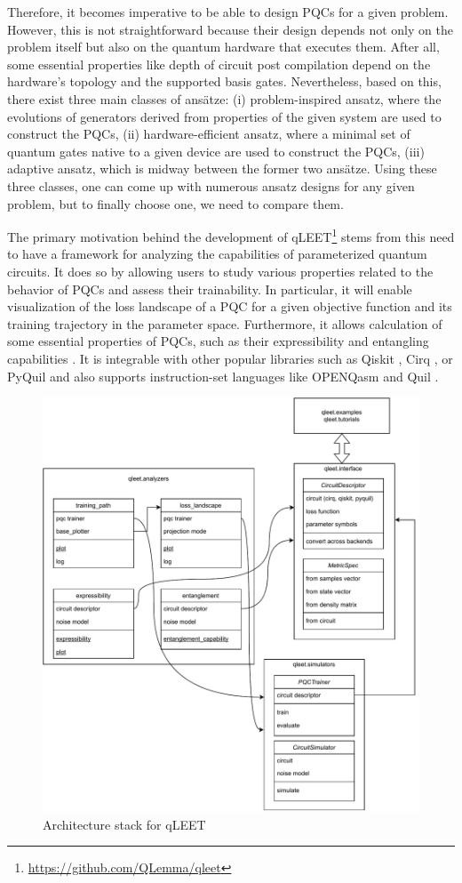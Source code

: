 Therefore, it becomes imperative to be able to design PQCs for a given problem. However, this is not straightforward because their design depends not only on the problem itself but also on the quantum hardware that executes them. After all, some essential properties like depth of circuit post compilation depend on the hardware's topology and the supported basis gates. Nevertheless, based on this, there exist three main classes of ansätze: (i) problem-inspired ansatz, where the evolutions of generators derived from properties of the given system are used to construct the PQCs, (ii) hardware-efficient ansatz, where a minimal set of quantum gates native to a given device are used to construct the PQCs, (iii) adaptive ansatz, which is midway between the former two ansätze. Using these three classes, one can come up with numerous ansatz designs for any given problem, but to finally choose one, we need to compare them.

The primary motivation behind the development of qLEET\footnote{\href{https://github.com/QLemma/qleet}{https://github.com/QLemma/qleet}} \cite{qleet-zenodo} stems from this need to have a framework for analyzing the capabilities of parameterized quantum circuits. It does so by allowing users to study various properties related to the behavior of PQCs and assess their trainability. In particular, it will enable visualization of the loss landscape of a PQC for a given objective function and its training trajectory in the parameter space. Furthermore, it allows calculation of some essential properties of PQCs, such as their expressibility and entangling capabilities \cite{expressibility-entanglability-guzik}. It is integrable with other popular libraries such as Qiskit \cite{comp_qiskit}, Cirq \cite{comp_cirq}, or PyQuil \cite{ccquad_Pyquil} and also supports instruction-set languages like OPENQasm \cite{2021arXiv210414722C} and Quil \cite{ccquad_Pyquil}.

\begin{figure}[!htp]
    \centering
    \includegraphics[width=0.5\linewidth]{figures/qleet/qleet-architecture.pdf}
    \caption{Architecture stack for qLEET}
    \label{qleet-fig:qleet-architecture}
\end{figure}

